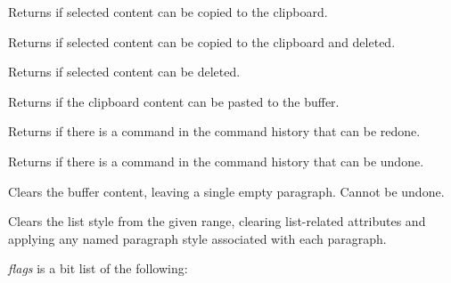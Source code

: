Returns \true if selected content can be copied to the clipboard.

\label{wxrichtextctrlcancut}


Returns \true if selected content can be copied to the clipboard and deleted.

\label{wxrichtextctrlcandeleteselection}


Returns \true if selected content can be deleted.

\label{wxrichtextctrlcanpaste}


Returns \true if the clipboard content can be pasted to the buffer.

\label{wxrichtextctrlcanredo}


Returns \true if there is a command in the command history that can be redone.

\label{wxrichtextctrlcanundo}


Returns \true if there is a command in the command history that can be undone.

\label{wxrichtextctrlclear}


Clears the buffer content, leaving a single empty paragraph. Cannot be undone.

\label{wxrichtextctrlclearliststyle}



Clears the list style from the given range, clearing list-related attributes and applying any named paragraph style associated with each paragraph.

{\it flags} is a bit list of the following:

